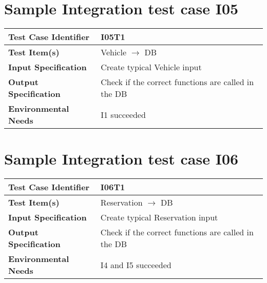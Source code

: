 \section{Sample Integration test case I05}\label{I05}
\begin{center}
	\vspace{0.6cm}
	\begin{tabular}{|l|l|}
		\hline
		\textbf{Test Case Identifier} & I05T1 \bigstrut \\\hline
		\textbf{Test Item(s)} & Vehicle \ensuremath{\rightarrow} DB \bigstrut \\\hline
		\textbf{Input Specification} & Create typical Vehicle input \bigstrut \\\hline
		\textbf{Output Specification} & Check if the correct functions are called in the DB \bigstrut \\\hline
		\textbf{Environmental Needs} & I1 succeeded\bigstrut \\\hline
	\end{tabular}
\end{center}

\section{Sample Integration test case I06}\label{I06}
\begin{center}
	\vspace{0.6cm}
	\begin{tabular}{|l|l|}
		\hline
		\textbf{Test Case Identifier} & I06T1 \bigstrut \\\hline
		\textbf{Test Item(s)} & Reservation \ensuremath{\rightarrow} DB \bigstrut \\\hline
		\textbf{Input Specification} & Create typical Reservation input \bigstrut \\\hline
		\textbf{Output Specification} & Check if the correct functions are called in the DB \bigstrut \\\hline
		\textbf{Environmental Needs} & I4 and I5 succeeded\bigstrut \\\hline
	\end{tabular}
\end{center}


